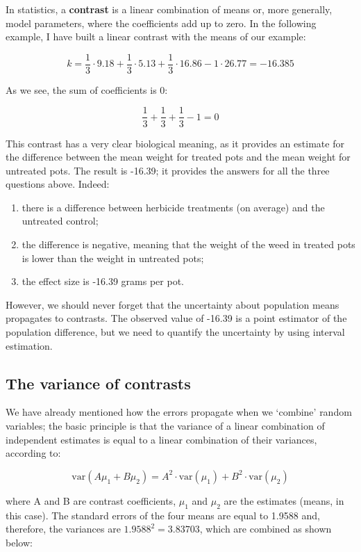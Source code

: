 \documentclass[a4paper,12pt,oneside]{book}
\providecommand{\tightlist}{%
  \setlength{\itemsep}{0pt}\setlength{\parskip}{0pt}}
\begin{document}
In statistics, a \textbf{contrast} is a linear combination of means or, more generally, model parameters, where the coefficients add up to zero. In the following example, I have built a linear contrast with the means of our example:

\[k = \frac{1}{3} \cdot 9.18 + \frac{1}{3} \cdot 5.13 + \frac{1}{3} \cdot 16.86 - 1 \cdot 26.77  = -16.385\]

As we see, the sum of coefficients is 0:

\[\frac{1}{3} + \frac{1}{3} + \frac{1}{3} - 1 = 0\]

This contrast has a very clear biological meaning, as it provides an estimate for the difference between the mean weight for treated pots and the mean weight for untreated pots. The result is -16.39; it provides the answers for all the three questions above. Indeed:

\begin{enumerate}
\def\labelenumi{\arabic{enumi}.}
\tightlist
\item
  there is a difference between herbicide treatments (on average) and the untreated control;
\item
  the difference is negative, meaning that the weight of the weed in treated pots is lower than the weight in untreated pots;
\item
  the effect size is -16.39 grams per pot.
\end{enumerate}

However, we should never forget that the uncertainty about population means propagates to contrasts. The observed value of -16.39 is a point estimator of the population difference, but we need to quantify the uncertainty by using interval estimation.

\hypertarget{the-variance-of-contrasts}{%
\subsection{The variance of contrasts}\label{the-variance-of-contrasts}}

We have already mentioned how the errors propagate when we `combine' random variables; the basic principle is that the variance of a linear combination of independent estimates is equal to a linear combination of their variances, according to:

\[\textrm{var}(A \mu_1 + B \mu_2) = A ^2 \cdot \textrm{var}(\mu_1)  + B ^2 \cdot \textrm{var}(\mu_2)\]

where A and B are contrast coefficients, \(\mu_1\) and \(\mu_2\) are the estimates (means, in this case). The standard errors of the four means are equal to 1.9588 and, therefore, the variances are \(1.9588^2 = 3.83703\), which are combined as shown below:
\end{document}
